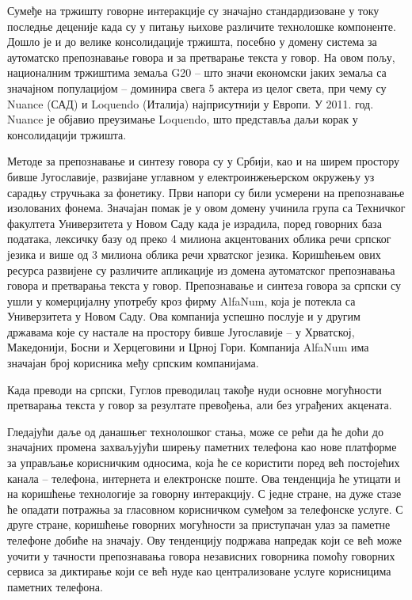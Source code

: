 {\begin{multicols}{2}
Сумеђе на тржишту говорне интеракције су значајно стандардизоване у току последње деценије када су у питању њихове различите технолошке компоненте. Дошло је и до велике консолидације тржишта, посебно у домену система за аутоматско препознавање говора и за претварање текста у говор. На овом пољу, националним тржиштима земаља G20 -- што значи економски јаких земаља са значајном популацијом -- доминира свега 5 актера из целог света, при чему су Nuance  (САД) и Loquendo (Италија) најприсутнији у Европи. У 2011. год. Nuance  је објавио преузимање Loquendo, што представља даљи корак у консолидацији тржишта.

Методе за препознавање и синтезу говора су у Србији, као и на ширем простору бивше Југославије, развијане углавном у електроинжењерском окружењу уз сарадњу стручњака за фонетику. Први напори су били усмерени на препознавање изолованих фонема. Значајан помак је у овом домену учинила група са Техничког факултета Универзитета у Новом Саду када је израдила, поред говорних база података, лексичку базу од преко 4 милиона акцентованих облика речи српског језика и више од 3 милиона облика речи хрватског језика. Коришћењем ових ресурса развијене су различите апликације из домена аутоматског препознавања говора и претварања текста у говор. Препознавање и синтеза говора за српски су ушли у комерцијалну употребу кроз фирму AlfaNum, која је потекла са Универзитета у Новом Саду. Ова компанија успешно послује и у другим државама које су настале на простору бивше Југославије – у Хрватској, Македонији, Босни и Херцеговини и Црној Гори. Компанија AlfaNum има значајан број корисника међу српским компанијама. 

Када преводи на српски, Гуглов преводилац такође нуди основне могућности претварања текста у говор за резултате превођења, али без уграђених акцената. 

Гледајући даље од данашњег технолошког стања, може се рећи да ће доћи до значајних промена захваљујући ширењу паметних телефона као нове платформе за управљање корисничким односима, која ће се користити поред већ постојећих канала – телефона, интернета и електронске поште. Ова тенденција ће утицати и на коришћење технологије за говорну интеракцију. С једне стране, на дуже стазе ће опадати потражња за гласовном корисничком сумеђом за телефонске услуге. С друге стране, коришћење говорних могућности за приступачан улаз за паметне телефоне добиће на значају. Ову тенденцију подржава напредак који се већ може уочити у тачности препознавања говора независних говорника помоћу говорних сервиса за диктирање који се већ нуде као централизоване услуге корисницима паметних телефона. 


\end{multicols}}
